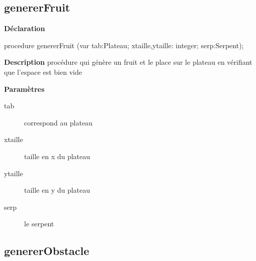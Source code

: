 \documentclass{report}
\newif\ifpdf
\begin{document}
\subsection*{genererFruit}
\fi
\label{Generation-genererFruit}
\begin{list}{}{
\setlength{\itemindent}{0cm}
\setlength{\listparindent}{0cm}
\setlength{\leftmargin}{\evensidemargin}
\addtolength{\leftmargin}{\tmplength}
\settowidth{\labelsep}{X}
\addtolength{\leftmargin}{\labelsep}
\setlength{\labelwidth}{\tmplength}
}
\item[\textbf{Déclaration}\hfill]
\ifpdf
\begin{flushleft}
\fi
\begin{ttfamily}
procedure genererFruit (var tab:Plateau; xtaille,ytaille: integer; serp:Serpent);\end{ttfamily}

\ifpdf
\end{flushleft}
\fi

\par
\item[\textbf{Description}]
procédure qui génère un fruit et le place sur le plateau en vérifiant que l'espace est bien vide    \par
\item[\textbf{Paramètres}]
\begin{description}
\item[tab] correspond au plateau
\item[xtaille] taille en x du plateau
\item[ytaille] taille en y du plateau
\item[serp] le serpent
\end{description}


\end{list}
\ifpdf
\subsection*{\large{\textbf{genererObstacle}}\normalsize\hspace{1ex}\hrulefill}
\else
\end{document}
